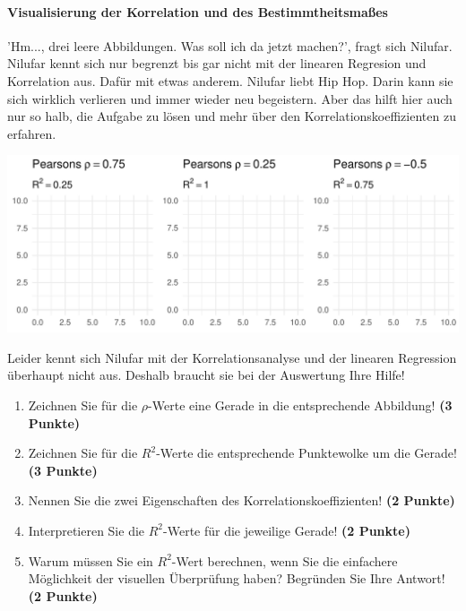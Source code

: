 \documentclass[a4paper, 9pt]{scrartcl}\usepackage[]{graphicx}\usepackage[]{xcolor}
\makeatletter
\def\maxwidth{ %
  \ifdim\Gin@nat@width>\linewidth
    \linewidth
  \else
    \Gin@nat@width
  \fi
}
\makeatother
\begin{document}
\ifcollection
\paragraph{Visualisierung der Korrelation und des Bestimmtheitsmaßes}
\fi

'Hm..., drei leere Abbildungen. Was soll ich da jetzt machen?', fragt sich Nilufar. Nilufar kennt sich nur begrenzt bis gar nicht mit der linearen Regresion und Korrelation aus. Dafür mit etwas anderem. Nilufar liebt Hip Hop. Darin kann sie sich wirklich verlieren und immer wieder neu begeistern. Aber das hilft hier auch nur so halb, die Aufgabe zu lösen und mehr über den Korrelationskoeffizienten zu erfahren.
\vspace{2Ex}



{\centering \includegraphics[width=\maxwidth]{img/correlation-01-1} 

}




\vspace{2Ex}

Leider kennt sich Nilufar mit der Korrelationsanalyse und der linearen Regression überhaupt nicht aus. Deshalb braucht sie bei der Auswertung Ihre Hilfe!

\begin{enumerate}
\item Zeichnen Sie für die $\rho$-Werte eine Gerade in die entsprechende Abbildung! \textbf{(3 Punkte)}
\item Zeichnen Sie für die $R^2$-Werte die entsprechende Punktewolke um die Gerade! \textbf{(3 Punkte)}
\item Nennen Sie die zwei Eigenschaften des Korrelationskoeffizienten! \textbf{(2 Punkte)}
\item Interpretieren Sie die $R^2$-Werte für die jeweilige Gerade! \textbf{(2 Punkte)}
\item Warum müssen Sie ein $R^2$-Wert berechnen, wenn Sie die einfachere Möglichkeit der visuellen Überprüfung haben? Begründen Sie Ihre Antwort! \textbf{(2 Punkte)}
\end{enumerate}
 
\end{document}
